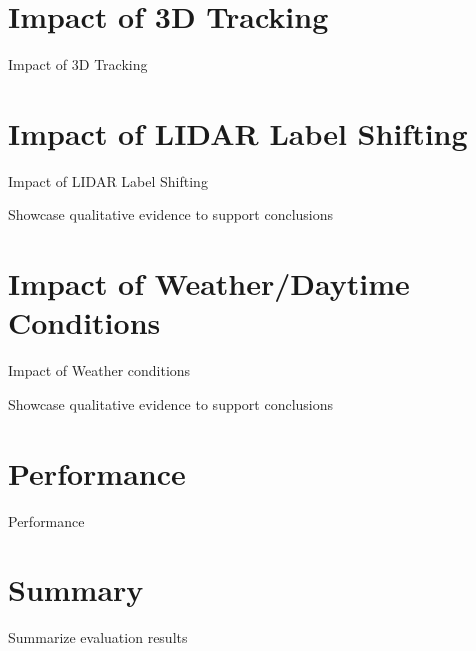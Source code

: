 \section{Impact of 3D Tracking}
\label{sec:impacttracking}

Impact of 3D Tracking

\newpage


\section{Impact of LIDAR Label Shifting}
\label{sec:impactlabelshifting}

Impact of LIDAR Label Shifting

Showcase qualitative evidence to support conclusions

\newpage


\section{Impact of Weather/Daytime Conditions}
\label{sec:weather}

Impact of Weather conditions

Showcase qualitative evidence to support conclusions

\newpage


\section{Performance}
\label{sec:performance}

Performance


\section{Summary}
\label{sec:summary}

Summarize evaluation results

